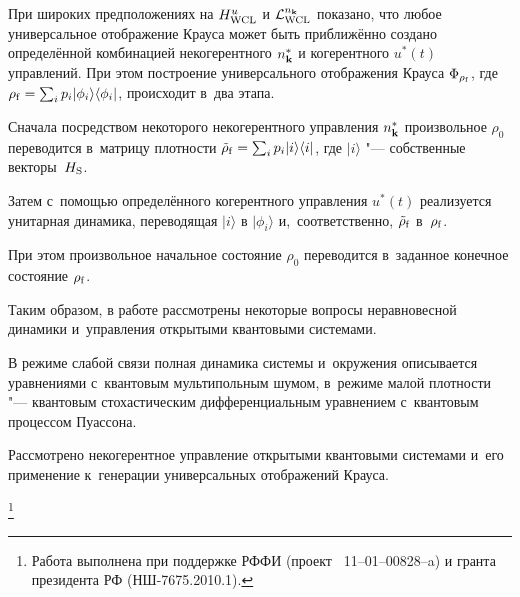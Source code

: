 При широких предположениях на $H_{\rm WCL}^{u}$ и ${\cal L}_{\rm WCL}^{n_{\bf k}}$ показано, что любое универсальное отображение Крауса может быть приближённо создано определённой комбинацией некогерентного $n^*_{\bf k}$ и когерентного $u^*(t)$ управлений. При этом построение универсального отображения Крауса $\Phi_{\rho_{\rm f}}$, где $\rho_{\rm f}=\sum_i p_i|\phi_i\rangle\langle\phi_i|$, происходит в~два этапа. 

Сначала посредством некоторого некогерентного управления $n^*_{\bf k}$ произвольное $\rho_0$ переводится в~матрицу плотности $\tilde\rho_{\rm f}=\sum_i p_i|i\rangle\langle i|$, где $|i\rangle$ "--- собственные векторы~$H_{\rm S}$. 

Затем с~помощью определённого когерентного управления $u^*(t)$ реализуется унитарная динамика, переводящая $|i\rangle$ в $|\phi_i\rangle$ и,~соответственно, $\tilde\rho_{\rm f}$ в~$\rho_{\rm f}$. 

При этом произвольное начальное состояние $\rho_0$ переводится в~заданное конечное состояние $\rho_{\rm f}$.



\smallskip

 Таким образом, в работе рассмотрены некоторые вопросы неравновесной динамики и~управления открытыми квантовыми системами. 

В режиме слабой связи полная динамика системы и~окружения описывается уравнениями с~квантовым мультипольным шумом, в~режиме малой плотности "--- квантовым стохастическим дифференциальным уравнением с~квантовым процессом Пуассона. 

Рассмотрено некогерентное управление открытыми квантовыми системами и~его применение к~генерации универсальных отображений Крауса.



\thanks{Работа выполнена при поддержке РФФИ (проект \No~11--01--00828--a) и гранта президента РФ (НШ-7675.2010.1).}



